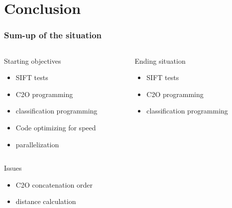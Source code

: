 \documentclass[xcolor=table]{beamer}
\begin{document}
\section{Conclusion}

\begin{frame} \frametitle{Sum-up of the situation}

\begin{columns}[t]
  \begin{column}{5cm}
  \begin{block}{Starting objectives}
	\begin{itemize}
		\item SIFT tests
		\item C2O programming
		\item classification programming
		\item Code optimizing for speed
		\item parallelization
	\end{itemize}
  \end{block}
  \end{column}

  \begin{column}{5cm}
  \begin{block}{Ending situation}
  \begin{itemize}
		\item SIFT tests
		\item C2O programming
		\item classification programming
  \end{itemize}
  \end{block}
  \end{column}
 \end{columns}

\begin{alertblock}{Issues}
	\begin{itemize}
		\item C2O concatenation order
		\item distance calculation
	\end{itemize}	
\end{alertblock}
\end{frame}
\end{document}
